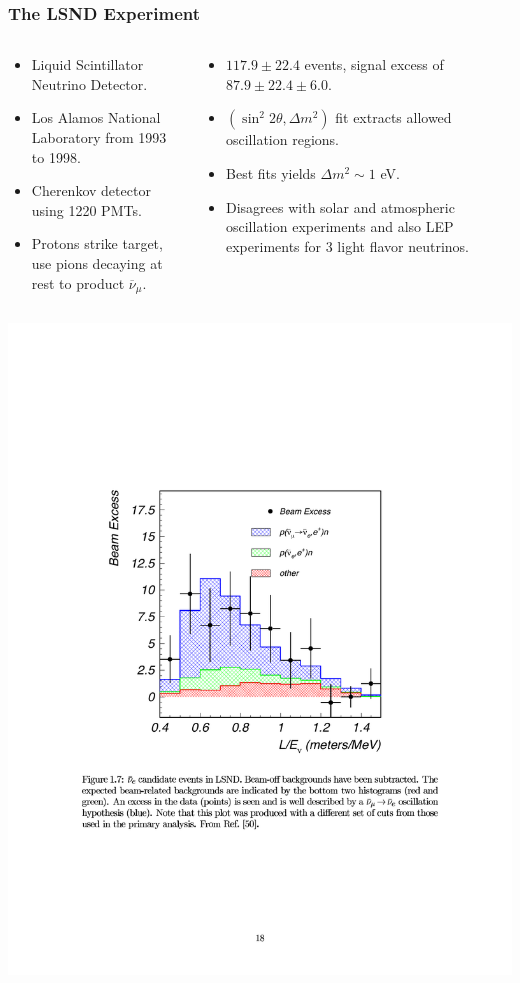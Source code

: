 \documentclass[mathserif,18pt,xcolor=table]{beamer}
\begin{document}
\begin{frame}
  \frametitle{The LSND Experiment}
  \footnotesize{
    \begin{columns}
      \begin{column}{.5\linewidth}      
        \begin{itemize}
        \item Liquid Scintillator Neutrino Detector.
        \item Los Alamos National Laboratory from 1993 to 1998.
        \item Cherenkov detector using 1220 PMTs.
        \item Protons strike target, use pions decaying at rest to product $\overline{\nu}_\mu$.
        \end{itemize}
      \end{column}
      \begin{column}{.5\linewidth}
        \begin{itemize}
        \item $117.9 \pm 22.4$ events, signal excess of $87.9\pm 22.4 \pm 6.0$.
        \item $(\sin^2 2\theta,\Delta m^2)$ fit extracts allowed oscillation regions.
        \item Best fits yields $\Delta m^2 \sim 1$ eV.
        \item Disagrees with solar and atmospheric oscillation experiments and also LEP experiments for 3 light flavor neutrinos.
        \end{itemize}
      \end{column}
    \end{columns}
  }
  \begin{center}
    \includegraphics[width=.35\linewidth]{../figures/LSND_plot.pdf}
  \end{center}
\end{frame}
\end{document}
